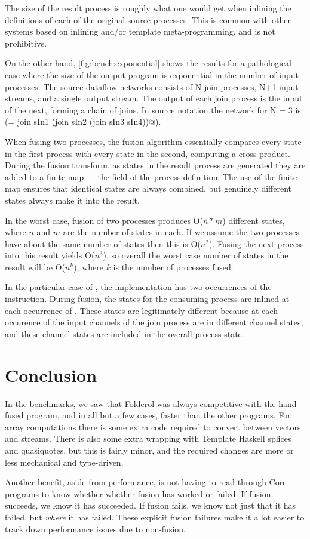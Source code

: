 

The size of the result process is roughly what one would get when inlining the definitions of each of the original source processes. This is common with other systems based on inlining and/or template meta-programming, and is not prohibitive.

On the other hand, \cref{fig:bench:exponential} shows the results for a pathological case where the size of the output program is exponential in the number of input processes. The source dataflow networks consists of N join processes, N+1 input streams, and a single output stream. The output of each join process is the input of the next, forming a chain of joins. In source notation the network for N = 3 is (\Hs@sOut = join sIn1 (join sIn2 (join sIn3 sIn4))@).

When fusing two processes, the fusion algorithm essentially compares every state in the first process with every state in the second, computing a cross product. During the fusion transform, as states in the result process are generated they are added to a finite map --- the \Hs@instrs@ field of the process definition. The use of the finite map ensures that identical states are always combined, but genuinely different states always make it into the result. 

In the worst case, fusion of two processes produces O($n*m$) different states, where $n$ and $m$ are the number of states in each. If we assume the two processes have about the same number of states then this is O($n^2$). Fusing the next process into this result yields O($n^3$), so overall the worst case number of states in the result will be O($n^k$), where $k$ is the number of processes fused. 

In the particular case of \Hs@join@, the implementation has two occurrences of the \Hs@push@ instruction. During fusion, the states for the consuming process are inlined at each occurrence of \Hs@push@. These states are legitimately different because at each occurence of \Hs@push@ the input channels of the join process are in different channel states, and these channel states are included in the overall process state.


\section{Conclusion}
In the benchmarks, we saw that Folderol was always competitive with the hand-fused program, and in all but a few cases, faster than the other programs.
For array computations there is some extra code required to convert between vectors and streams.
There is also some extra wrapping with Template Haskell splices and quasiquotes, but this is fairly minor, and the required changes are more or less mechanical and type-driven.

Another benefit, aside from performance, is not having to read through Core programs to know whether whether fusion has worked or failed.
If fusion succeeds, we know it has succeeded.
If fusion fails, we know not just that it has failed, but \emph{where} it has failed.
These explicit fusion failures make it a lot easier to track down performance issues due to non-fusion.

